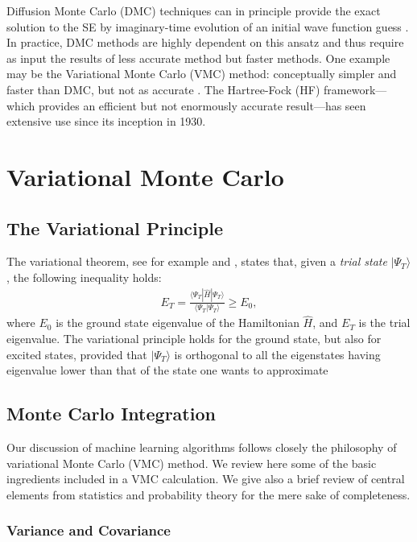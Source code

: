 \documentclass[twoside,english]{uiofysmaster}
\begin{document}
Diffusion Monte Carlo (DMC) techniques can in principle provide the
exact solution to the SE by imaginary-time evolution of an initial
wave function guess \cite{HjortJensen2015,Hammond1994}.  In practice,
DMC methods are highly dependent on this ansatz and thus require as
input the results of less accurate method but faster methods. One
example may be the Variational Monte Carlo (VMC) method: conceptually
simpler and faster than DMC, but not as accurate \cite{Hammond1994}.
The Hartree-Fock (HF) framework—which provides an 
efficient but not enormously accurate result—has seen extensive use since its inception in 1930.


\section{Variational Monte Carlo}
\subsection{The Variational Principle}
The variational theorem,  see for example \cite{Kvaal2017} and \cite{Helgaker2000}, states that,
given a \textit{trial state} $| \Psi_T \rangle$, the following inequality holds:
\begin{align}
	E_T = \frac{ \langle \Psi_T | \hat{H} | \Psi_T \rangle }{ \langle \Psi_T |\Psi_T \rangle } \geq E_0,
\end{align}
where $E_0$ is the ground state eigenvalue of the Hamiltonian
$\hat{H}$, and $E_T$ is the trial eigenvalue. The variational
principle holds for the ground state, but also for excited states,
provided that $|\Psi_T \rangle$ is orthogonal to all the eigenstates
having eigenvalue lower than that of the state one wants to
approximate \cite{HjortJensen2017}

\subsection{Monte Carlo Integration}
\label{sec:MC}
Our discussion of machine learning algorithms follows closely the philosophy of variational Monte Carlo (VMC) method.  We review here some of the basic ingredients included in a VMC calculation. We give also a brief review of central elements from statistics and probability theory for the mere sake of completeness.

\subsubsection{Variance and Covariance}
\end{document}
